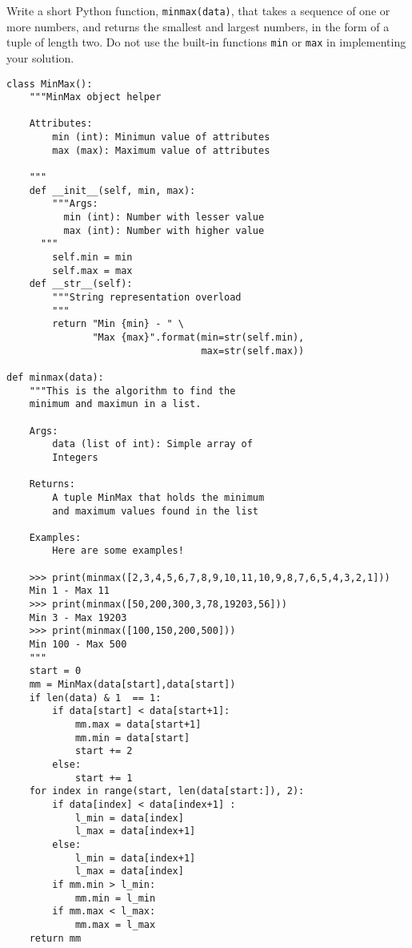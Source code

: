  \label{sssec:ex1_3}

Write a short Python function, \texttt{minmax(data)}, that takes a sequence of one or more numbers, and returns the smallest and largest numbers, in the form of a tuple of length two. Do not use the built-in functions \texttt{min} or \texttt{max} in implementing your solution.

\begin{lstlisting}[title=Exercise R-1.3]
class MinMax():
    """MinMax object helper

    Attributes:
        min (int): Minimun value of attributes
        max (max): Maximum value of attributes

    """
    def __init__(self, min, max):
        """Args:
          min (int): Number with lesser value
          max (int): Number with higher value
      """
        self.min = min
        self.max = max
    def __str__(self):
        """String representation overload
        """
        return "Min {min} - " \
               "Max {max}".format(min=str(self.min),
                                  max=str(self.max))

def minmax(data):
    """This is the algorithm to find the
    minimum and maximun in a list.

    Args:
        data (list of int): Simple array of
        Integers

    Returns:
        A tuple MinMax that holds the minimum
        and maximum values found in the list

    Examples:
        Here are some examples!

    >>> print(minmax([2,3,4,5,6,7,8,9,10,11,10,9,8,7,6,5,4,3,2,1]))
    Min 1 - Max 11
    >>> print(minmax([50,200,300,3,78,19203,56]))
    Min 3 - Max 19203
    >>> print(minmax([100,150,200,500]))
    Min 100 - Max 500
    """
    start = 0
    mm = MinMax(data[start],data[start])
    if len(data) & 1  == 1:
        if data[start] < data[start+1]:
            mm.max = data[start+1]
            mm.min = data[start]
            start += 2
        else:
            start += 1
    for index in range(start, len(data[start:]), 2):
        if data[index] < data[index+1] :
            l_min = data[index]
            l_max = data[index+1]
        else:
            l_min = data[index+1]
            l_max = data[index]
        if mm.min > l_min:
            mm.min = l_min
        if mm.max < l_max:
            mm.max = l_max
    return mm
\end{lstlisting}